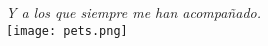 \begin{center}
\begin{adjustwidth}{-1pt}{-1pt}
            \vspace{1cm}
            
            \begin{flushright}
                \textit{Y a los que siempre me han acompañado.}
                \\ \vspace{0.2cm}
                \texttt{[image: pets.png]}
            \end{flushright}
        \end{adjustwidth}
\end{center}

{}

\newpage